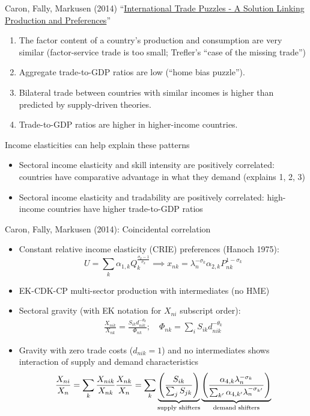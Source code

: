 \documentclass[11pt,notes=hide,aspectratio=169]{beamer}
\begin{document}
\begin{frame}{Caron, Fally, Markusen (2014)}
``\href{http://qje.oxfordjournals.org/content/129/3/1501}{International Trade Puzzles - A Solution Linking Production and Preferences}''
\begin{enumerate}
\item The factor content of a country's production and consumption are very similar
(factor-service trade is too small; Trefler's ``case of the missing trade'')
\item Aggregate trade-to-GDP ratios are low (``home bias puzzle'').
\item Bilateral trade between countries with similar incomes is higher than predicted by supply-driven theories.
\item Trade-to-GDP ratios are higher in higher-income countries.
\end{enumerate}
Income elasticities can help explain these patterns
\begin{itemize}
\item Sectoral income elasticity and skill intensity are positively correlated: countries have comparative advantage in what they demand (explains 1, 2, 3)
\item Sectoral income elasticity and tradability are positively correlated: high-income countries have higher trade-to-GDP ratios
\end{itemize}
\end{frame}
\begin{frame}{Caron, Fally, Markusen (2014): Coincidental correlation}
\begin{itemize}
	\item Constant relative income elasticity (CRIE) preferences (Hanoch 1975):
	$$U = \sum_k \alpha_{1,k} Q_{k}^{\frac{\sigma_k-1}{\sigma_k}} \implies x_{nk} = \lambda_n^{-\sigma_k} \alpha_{2,k}P_{nk}^{1-\sigma_k}$$
	\item EK-CDK-CP multi-sector production with intermediates (no HME)
	\item Sectoral gravity (with EK notation for $X_{ni}$ subscript order):
	\begin{align*}
	\frac{X_{nik}}{X_{nk}}
	= 
	\frac{S_{ik} d_{nik}^{-\theta_k}}{\Phi_{nk}} ; \quad \Phi_{nk} = \sum_i S_{ik} d_{nik}^{-\theta_k}
	\end{align*}
	\item Gravity with zero trade costs ($d_{nik}=1$) and no intermediates shows interaction of supply and demand characteristics
\begin{align*}
	\frac{X_{ni}}{X_n} 
	= 
	\sum_{k} \frac{X_{nik}}{X_{nk}} \frac{X_{nk}}{X_n} 
	=
	\sum_k \underbrace{\left(\frac{S_{ik}}{\sum_j S_{jk}}\right)}_{\textnormal{supply shifters}} \underbrace{\left(\frac{\alpha_{4,k} \lambda_n^{-\sigma_k}} {\sum_{k'} \alpha_{4,k'} \lambda_n^{-\sigma_{k'}}} \right)}_{\textnormal{demand shifters}}
\end{align*}
\end{itemize}
\end{frame}
\end{document}
